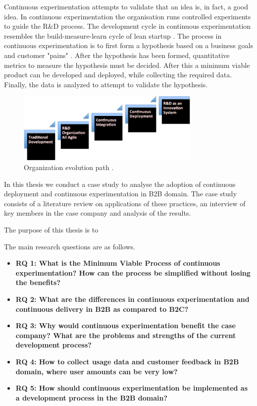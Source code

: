 \documentclass[english]{tktltiki2}
\theoremstyle{definition}
\theoremstyle{remark}
\begin{document}
Continuous experimentation attempts to validate that an idea is, in fact, a good idea. In continuous experimentation the organisation runs controlled experiments to guide the R\&D process. The development cycle in continuous experimentation resembles the build-measure-learn cycle of lean startup \cite{ries2011lean}. The process in continuous experimentation is to first form a hypothesis based on a business goals and customer "pains" \cite{bosch2012building}. After the hypothesis has been formed, quantitative metrics to measure the hypothesis must be decided. After this a minimum viable product can be developed and deployed, while collecting the required data. Finally, the data is analyzed to attempt to validate the hypothesis.


\begin{figure}[h]
	\centering
	\includegraphics[width=3.5in]{stairway.png}
	\caption{Organization evolution path \cite{olsson2012climbing}.}
\end{figure}

In this thesis we conduct a case study to analyse the adoption of continuous deployment and continuous experimentation in B2B domain. The case study consists of a literature review on applications of these practices, an interview of key members in the case company and analysis of the results. 

The purpose of this thesis is to

The main research questions are as follows.
\begin{itemize}
\item  \textbf{RQ 1: What is the Minimum Viable Process of continuous experimentation? How can the process be simplified without losing the benefits?}
\item  \textbf{RQ 2: What are the differences in continuous experimentation and continuous delivery in B2B as compared to B2C?}
\item  \textbf{RQ 3: Why would continuous experimentation benefit the case company? What are the problems and strengths of the current development process?}
\item  \textbf{RQ 4: How to collect usage data and customer feedback in B2B domain, where user amounts can be very low?}
\item  \textbf{RQ 5: How should continuous experimentation be implemented as a development process in the B2B domain?}
\end{itemize}
\end{document}
